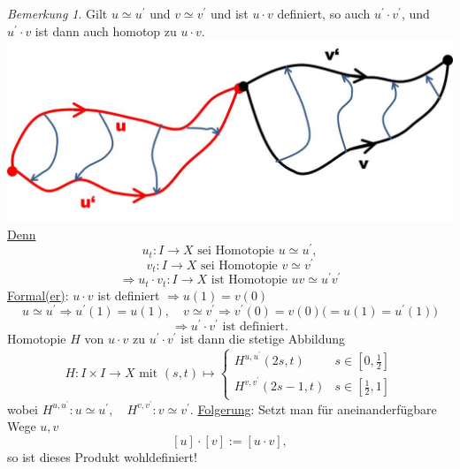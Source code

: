 \documentclass[a4paper,11pt,notitlepage]{report}
\theoremstyle{remark}
\newtheorem{remark}{Bemerkung}[chapter]
\theoremstyle{definition}
\begin{document}
\begin{remark}{}
	Gilt $u \simeq u^\prime$ und $v \simeq v^\prime$ und ist $u \cdot v$ definiert, so auch $u^\prime \cdot v^\prime$, und $u^\prime \cdot v$ ist dann auch homotop zu $u \cdot v$.
	\newline \includegraphics[scale=0.4]{images/Homotopie_Produkt.jpg}
	\newline
	\underline{Denn}
	$$u_t \colon I \rightarrow X \text{ sei Homotopie } u \simeq u^\prime,$$
	$$v_t \colon I \rightarrow X \text{ sei Homotopie } v \simeq v^\prime$$
	$$\Rightarrow u_t \cdot v_t \colon I \rightarrow X \text{ ist Homotopie } uv \simeq u^\prime v^\prime$$
	\underline{Formal(er)}: $u \cdot v$ ist definiert $\Rightarrow u(1) = v(0)$
	$$u \simeq u^\prime \Rightarrow u^\prime(1)=u(1), \quad v \simeq v^\prime \Rightarrow v^\prime(0) = v(0)  \big(=u(1)=u^\prime(1)\big)$$
	$$\Rightarrow u^\prime \cdot v^\prime \text{ ist definiert.}$$
	Homotopie $H$ von $u \cdot v$ zu $u^\prime \cdot v^\prime$ ist dann die stetige Abbildung
	$$H \colon I \times I \rightarrow X \text{ mit } (s,t) \mapsto \begin{cases} H^{u,u^\prime}(2s,t) & s \in [0,\frac{1}{2}] \\ H^{v,v^\prime}(2s-1,t) & s \in [\frac{1}{2},1] \end{cases}$$
	wobei $H^{u,u^\prime} \colon u \simeq u^\prime, \quad H^{v,v^\prime} \colon v \simeq v^\prime$.
	\newline
	\underline{Folgerung}: Setzt man für aneinanderfügbare Wege $u,v$
	$$[u] \cdot [v] := [u \cdot v],$$
	so ist dieses Produkt wohldefiniert!
\end{remark}
\end{document}
